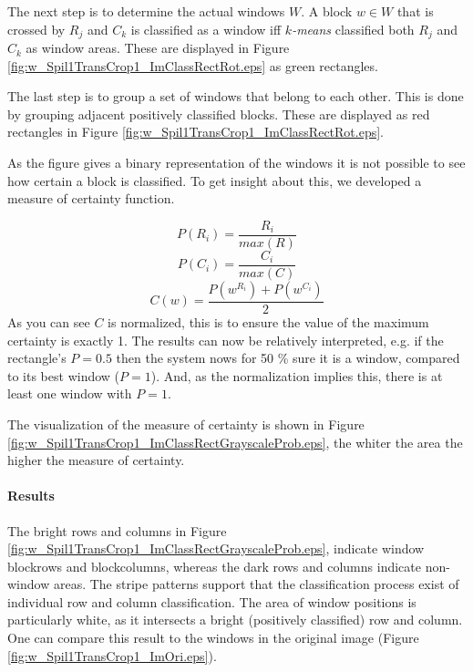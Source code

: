 The next step is to determine the actual windows $W$.
A block $w\in W$ that is crossed by $R_j$ and $C_k$ is classified as a
window iff \emph{$k$-means} classified both $R_j$ and $C_k$ as window areas. These are displayed in 
 Figure \ref{fig:w_Spil1TransCrop1_ImClassRectRot.eps} as green rectangles.

The last step is to group a set of windows that belong to each other. This is done by 
grouping adjacent positively classified blocks. These are displayed as red
rectangles in Figure \ref{fig:w_Spil1TransCrop1_ImClassRectRot.eps}.

As the figure gives a binary representation of the windows it is not possible
to see how certain a block is classified.
To get insight about this, we developed a measure of certainty function.

\[P(R_i) = \frac{R_i}{max(R)}\]
\[P(C_i) = \frac{C_i}{max(C)}\]
\[C(w) = \frac{P(w^{R_i}) + P(w^{C_i})}{2}\]
As you can see $C$ is normalized, this is to ensure the value of the maximum
certainty is exactly 1. The results can now be relatively interpreted, e.g. if the rectangle's $P=0.5$
then the system nows for 50 \% sure it is a window, compared to its best window ($P=1$). 
And, as the normalization implies this, there is at least one window with $P=1$. 

The visualization of the measure of certainty is shown in Figure
\ref{fig:w_Spil1TransCrop1_ImClassRectGrayscaleProb.eps},  
the whiter the area the higher the measure of certainty.



\newpage
\paragraph{Results} %
\clearpage

The bright rows and columns in Figure
\ref{fig:w_Spil1TransCrop1_ImClassRectGrayscaleProb.eps},  indicate window
blockrows and blockcolumns, whereas the dark rows and columns indicate
non-window areas.
The stripe patterns support that the classification process exist of individual
row and column classification.
The area of window positions is particularly white, as it 
intersects a bright (positively classified) row and column.
One can compare this result to the windows in the original image 
(Figure \ref{fig:w_Spil1TransCrop1_ImOri.eps}).

